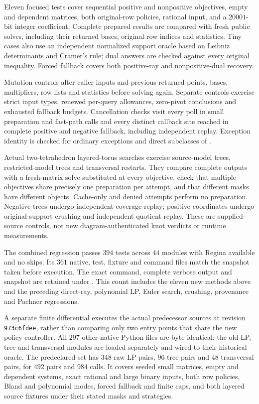 Eleven focused tests cover sequential positive and nonpositive objectives,
empty and dependent matrices, both original-row policies, rational input,
and a $20001$-bit integer coefficient.  Complete prepared results are compared
with fresh public solves, including their returned bases, original-row
indices and statistics.  Tiny cases also use an independent normalized
support oracle based on Leibniz determinants and Cramer's rule; dual answers
are checked against every original inequality.  Forced fallback covers
both positive-ray and nonpositive-dual recovery.

Mutation controls alter caller inputs and previous returned points, bases,
multipliers, row lists and statistics before solving again.  Separate
controls exercise strict input types, renewed per-query allowances,
zero-pivot conclusions and exhausted fallback budgets.  Cancellation checks
visit every poll in small preparation and fast-path calls and every
distinct callback site reached in complete positive and negative fallback,
including independent replay.  Exception identity is checked for ordinary
exceptions and direct subclasses of .

Actual two-tetrahedron layered-torus searches exercise source-model trees,
restricted-model trees and transversal restarts.  They compare complete
outputs with a fresh-matrix solve substituted at every objective, check
that multiple objectives share precisely one preparation per attempt,
and that different masks have different objects.  Cache-only and denied
attempts perform no preparation.  Negative trees undergo independent
coverage replay; positive coordinates undergo original-support crushing
and independent quotient replay.  These are supplied-source controls,
not new diagram-authenticated knot verdicts or runtime measurements.

The combined regression passes $394$ tests across $44$ modules with Regina
available and no skips.  Its $361$ native, test, fixture and command files
match the snapshot taken before execution.  The exact command, complete
verbose output and snapshot are retained under
.  This count includes the eleven new
methods above and the preceding direct-ray, polynomial LP, Euler search,
crushing, provenance and Pachner regressions.

A separate finite differential executes the actual predecessor sources at
revision \texttt{973c6fdee}, rather than comparing only two entry points
that share the new policy controller.  All $297$ other native Python files
are byte-identical; the old LP, tree and transversal modules are loaded
separately and wired to their historical oracle.  The predeclared set has
$348$ raw LP pairs, $96$ tree pairs and $48$ transversal pairs, for $492$
pairs and $984$ calls.  It covers seeded small matrices, empty and dependent
systems, exact rational and large binary inputs, both row policies, Bland
and polynomial modes, forced fallback and finite caps, and both layered
source fixtures under their stated masks and strategies.

